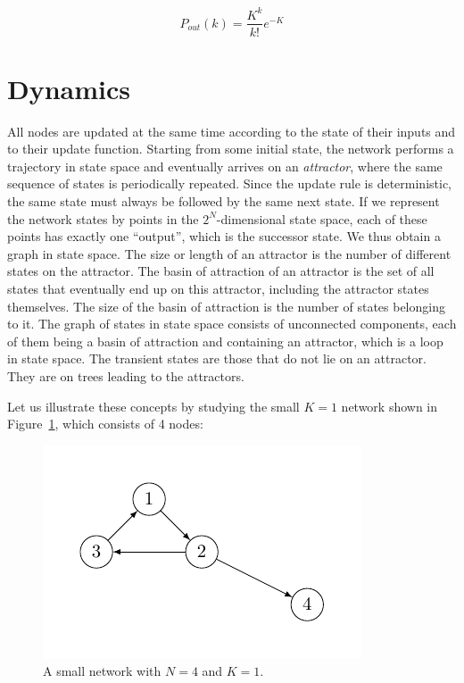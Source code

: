 $$
P_{out}(k) = \frac{K^k}{k!}e^{-K}
$$

\section{Dynamics}

All nodes are updated at the same time
according to the state of their inputs and to their update
function. Starting from some initial state, the network
performs a trajectory in state space and eventually arrives on an \emph{attractor}, where the same sequence of states
is periodically repeated. Since the update rule is deterministic, the same state must always be followed by the
same next state. If we represent the network states by
points in the $2^N$-dimensional state space, each of these
points has exactly one “output”, which is the successor
state. We thus obtain a graph in state space.
The size or length of an attractor is the number of
different states on the attractor. The basin of attraction
of an attractor is the set of all states that eventually
end up on this attractor, including the attractor states
themselves. The size of the basin of attraction is the
number of states belonging to it. The graph of states
in state space consists of unconnected components, each
of them being a basin of attraction and containing an
attractor, which is a loop in state space. The transient
states are those that do not lie on an attractor. They are
on trees leading to the attractors.


Let us illustrate these concepts by studying the small
$K = 1$ network shown in Figure~\ref{fig:rb2}, which consists of 4
nodes:

\begin{figure}[h]
\centering
\includegraphics[scale=1]{figurenetworks2.pdf}
\caption{A small network with $N=4$ and $K=1$.}
\label{fig:rb2}
\end{figure}

